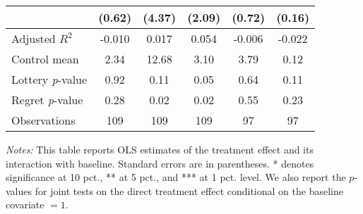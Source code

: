 \begin{table}[htbp]
{\begin{threeparttable}
\begin{tabular}{l*{5}{c}}
                &   (0.62)         &   (4.37)         &   (2.09)         &   (0.72)         &   (0.16)         \\
\midrule
Adjusted \(R^{2}\)&   -0.010         &    0.017         &    0.054         &   -0.006         &   -0.022         \\
Control mean    &     2.34         &    12.68         &     3.10         &     3.79         &     0.12         \\
Lottery \emph{p}-value&     0.92         &     0.11         &     0.05         &     0.64         &     0.11         \\
Regret \emph{p}-value&     0.28         &     0.02         &     0.02         &     0.55         &     0.23         \\
Observations    &      109         &      109         &      109         &       97         &       97         \\
\bottomrule \end{tabular} \begin{tablenotes}[flushleft] \footnotesize \item \emph{Notes:} This table reports OLS estimates of the treatment effect and its interaction with baseline. Standard errors are in parentheses. * denotes significance at 10 pct., ** at 5 pct., and *** at 1 pct. level. We also report the \(p\)-values for joint tests on the direct treatment effect conditional on the baseline covariate $= 1$. \end{tablenotes} \end{threeparttable} } \end{table}
